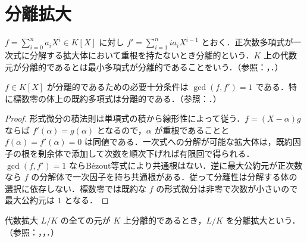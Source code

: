 \section{分離拡大}
\begin{defn}[形式微分と分離多項式]
$f=\sum_{i=0}^n a_iX^i\in K[X]$ に対し $f'=\sum_{i=1}^n ia_i X^{i-1}$ とおく．正次数多項式が一次式に分解する拡大体において重根を持たないとき分離的という．$K$ 上の代数元が分離的であるとは最小多項式が分離的であることをいう．（参照：，．）
\end{defn}
\begin{prop}[重根と形式微分]
$f\in K[X]$ が分離的であるための必要十分条件は $\gcd(f,f')=1$ である．特に標数零の体上の既約多項式は分離的である．（参照：．）
\end{prop}
\begin{proof}
形式微分の積法則は単項式の積から線形性によって従う．$f=(X-\alpha)g$ ならば $f'(\alpha)=g(\alpha)$ となるので，$\alpha$ が重根であることと $f(\alpha)=f'(\alpha)=0$ は同値である．一次式への分解が可能な拡大体は，既約因子の根を剰余体で添加して次数を順次下げれば有限回で得られる．$\gcd(f,f')=1$ ならBézout等式により共通根はない．逆に最大公約元が正次数なら $f$ の分解体で一次因子を持ち共通根がある．従って分離性は分解する体の選択に依存しない．標数零では既約な $f$ の形式微分は非零で次数が小さいので最大公約元は $1$ となる．
\end{proof}
\begin{defn}[分離拡大]
代数拡大 $L/K$ の全ての元が $K$ 上分離的であるとき，$L/K$ を分離拡大という．（参照：，，．）
\end{defn}
